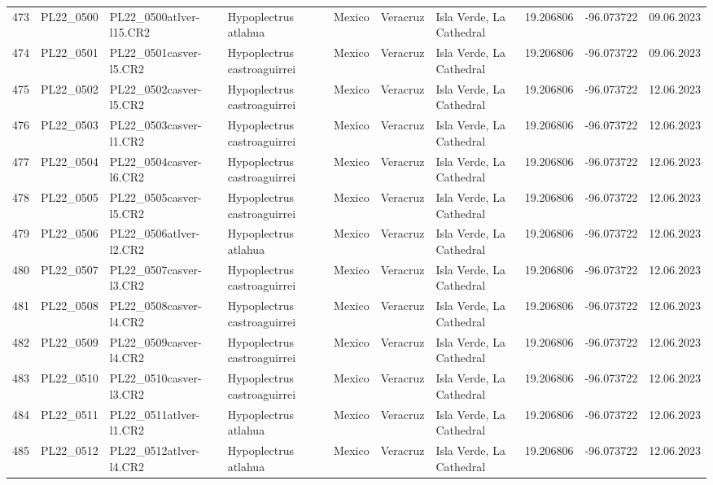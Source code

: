 \begin{table}[ht]
\begin{tabular}{rlllllllll}
  473 & PL22\_0500 & PL22\_0500atlver-l15.CR2 & Hypoplectrus atlahua & Mexico & Veracruz & Isla Verde, La Cathedral & 19.206806 & -96.073722 & 09.06.2023 \\ 
  474 & PL22\_0501 & PL22\_0501casver-l5.CR2 & Hypoplectrus castroaguirrei & Mexico & Veracruz & Isla Verde, La Cathedral & 19.206806 & -96.073722 & 09.06.2023 \\ 
  475 & PL22\_0502 & PL22\_0502casver-l5.CR2 & Hypoplectrus castroaguirrei & Mexico & Veracruz & Isla Verde, La Cathedral & 19.206806 & -96.073722 & 12.06.2023 \\ 
  476 & PL22\_0503 & PL22\_0503casver-l1.CR2 & Hypoplectrus castroaguirrei & Mexico & Veracruz & Isla Verde, La Cathedral & 19.206806 & -96.073722 & 12.06.2023 \\ 
  477 & PL22\_0504 & PL22\_0504casver-l6.CR2 & Hypoplectrus castroaguirrei & Mexico & Veracruz & Isla Verde, La Cathedral & 19.206806 & -96.073722 & 12.06.2023 \\ 
  478 & PL22\_0505 & PL22\_0505casver-l5.CR2 & Hypoplectrus castroaguirrei & Mexico & Veracruz & Isla Verde, La Cathedral & 19.206806 & -96.073722 & 12.06.2023 \\ 
  479 & PL22\_0506 & PL22\_0506atlver-l2.CR2 & Hypoplectrus atlahua & Mexico & Veracruz & Isla Verde, La Cathedral & 19.206806 & -96.073722 & 12.06.2023 \\ 
  480 & PL22\_0507 & PL22\_0507casver-l3.CR2 & Hypoplectrus castroaguirrei & Mexico & Veracruz & Isla Verde, La Cathedral & 19.206806 & -96.073722 & 12.06.2023 \\ 
  481 & PL22\_0508 & PL22\_0508casver-l4.CR2 & Hypoplectrus castroaguirrei & Mexico & Veracruz & Isla Verde, La Cathedral & 19.206806 & -96.073722 & 12.06.2023 \\ 
  482 & PL22\_0509 & PL22\_0509casver-l4.CR2 & Hypoplectrus castroaguirrei & Mexico & Veracruz & Isla Verde, La Cathedral & 19.206806 & -96.073722 & 12.06.2023 \\ 
  483 & PL22\_0510 & PL22\_0510casver-l3.CR2 & Hypoplectrus castroaguirrei & Mexico & Veracruz & Isla Verde, La Cathedral & 19.206806 & -96.073722 & 12.06.2023 \\ 
  484 & PL22\_0511 & PL22\_0511atlver-l1.CR2 & Hypoplectrus atlahua & Mexico & Veracruz & Isla Verde, La Cathedral & 19.206806 & -96.073722 & 12.06.2023 \\ 
  485 & PL22\_0512 & PL22\_0512atlver-l4.CR2 & Hypoplectrus atlahua & Mexico & Veracruz & Isla Verde, La Cathedral & 19.206806 & -96.073722 & 12.06.2023 \\ 

\end{tabular}
\end{table}
